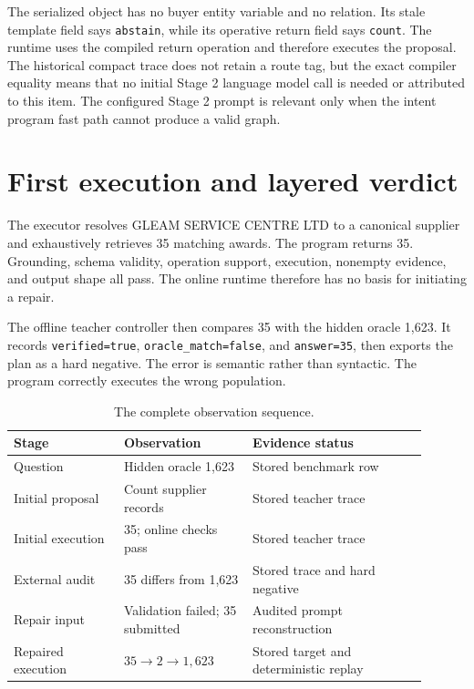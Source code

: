 \documentclass[10pt]{article}
\begin{document}
The serialized object has no buyer entity variable and no relation.  Its stale template field says
\texttt{abstain}, while its operative return field says \texttt{count}.  The runtime uses the
compiled return operation and therefore executes the proposal.  The historical compact trace does
not retain a route tag, but the exact compiler equality means that no initial Stage 2 language model
call is needed or attributed to this item.  The configured Stage 2 prompt is relevant only when the
intent program fast path cannot produce a valid graph.

\section{First execution and layered verdict}

The executor resolves GLEAM SERVICE CENTRE LTD to a canonical supplier and exhaustively retrieves
35 matching awards.  The program returns 35.  Grounding, schema validity, operation support,
execution, nonempty evidence, and output shape all pass.  The online runtime therefore has no basis
for initiating a repair.

The offline teacher controller then compares 35 with the hidden oracle 1,623.  It records
\texttt{verified=true}, \texttt{oracle\_match=false}, and \texttt{answer=35}, then exports the plan
as a hard negative.  The error is semantic rather than syntactic.  The program correctly executes
the wrong population.

\begin{table}[h]
\centering
\small
\begin{tabular}{p{0.24\linewidth}p{0.28\linewidth}p{0.38\linewidth}}
\toprule
Stage & Observation & Evidence status \\
\midrule
Question & Hidden oracle 1,623 & Stored benchmark row \\
Initial proposal & Count supplier records & Stored teacher trace \\
Initial execution & 35; online checks pass & Stored teacher trace \\
External audit & 35 differs from 1,623 & Stored trace and hard negative \\
Repair input & Validation failed; 35 submitted & Audited prompt reconstruction \\
Repaired execution & $35\rightarrow2\rightarrow1{,}623$ & Stored target and deterministic replay \\
\bottomrule
\end{tabular}
\caption{The complete observation sequence.}
\end{table}
\end{document}

